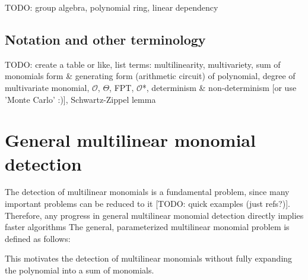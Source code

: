 TODO: group algebra, polynomial ring, linear dependency

\subsection{Notation and other terminology} %

TODO: create a table or like, list terms: 
multilinearity, multivariety, sum of monomials form \& generating form (arithmetic circuit) of polynomial, 
degree of multivariate monomial, $\mathcal{O}$, $\Theta$, FPT, $\mathcal{O}$*, determinism \& non-determinism [or use 'Monte Carlo' :)], 
Schwartz-Zippel lemma


\section{General multilinear monomial detection}

The detection of multilinear monomials is a fundamental problem, 
since many important problems can be reduced to it [TODO: quick examples (just refs?)]. 
Therefore, any progress in general multilinear monomial detection directly implies 
faster algorithms
The general, parameterized multilinear monomial problem is defined as follows: 

\begin{problem}
\end{problem}

This motivates the detection of multilinear monomials without fully expanding the polynomial into a sum of monomials.

